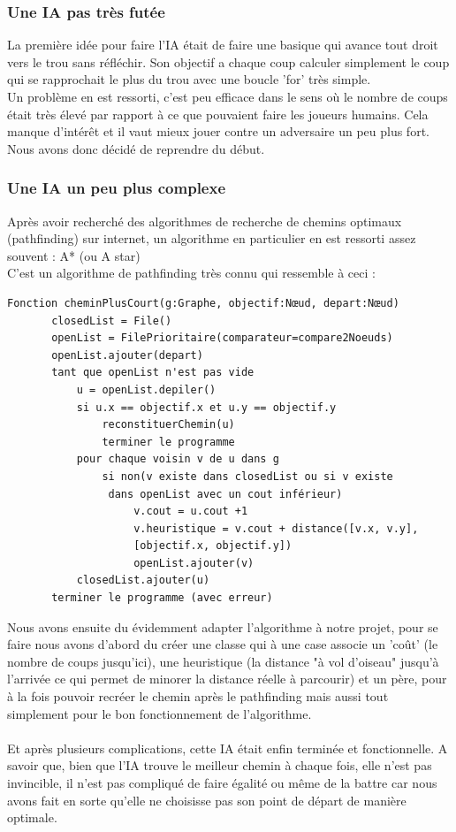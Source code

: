 \documentclass{article}
\begin{document}
\subsubsection{Une IA pas très futée}
La première idée pour faire l'IA était de faire une basique qui avance tout droit vers le trou sans réfléchir. Son objectif a chaque coup calculer simplement le coup qui se rapprochait le plus du trou avec une boucle 'for' très simple.\\
Un problème en est ressorti, c'est peu efficace dans le sens où le nombre de coups était très élevé par rapport à ce que pouvaient faire les joueurs humains. Cela manque d'intérêt et il vaut mieux jouer contre un adversaire un peu plus fort. Nous avons donc décidé de reprendre du début.\\
\subsubsection{Une IA un peu plus complexe}
Après avoir recherché des algorithmes de recherche de chemins optimaux (pathfinding) sur internet, un algorithme en particulier en est ressorti assez souvent : A* (ou A star)\\
C'est un algorithme de pathfinding très connu qui ressemble à ceci :
\begin{verbatim}
Fonction cheminPlusCourt(g:Graphe, objectif:Nœud, depart:Nœud)
       closedList = File()
       openList = FilePrioritaire(comparateur=compare2Noeuds)
       openList.ajouter(depart)
       tant que openList n'est pas vide
           u = openList.depiler()
           si u.x == objectif.x et u.y == objectif.y
               reconstituerChemin(u)
               terminer le programme
           pour chaque voisin v de u dans g
               si non(v existe dans closedList ou si v existe
                dans openList avec un cout inférieur)
                    v.cout = u.cout +1 
                    v.heuristique = v.cout + distance([v.x, v.y], 
                    [objectif.x, objectif.y])
                    openList.ajouter(v)
           closedList.ajouter(u)
       terminer le programme (avec erreur)
\end{verbatim}
Nous avons ensuite du évidemment adapter l'algorithme à notre projet, pour se faire nous avons d'abord du créer une classe qui à une case associe un 'coût' (le nombre de coups jusqu'ici), une heuristique (la distance "à vol d'oiseau" jusqu'à l'arrivée ce qui permet de minorer la distance réelle à parcourir) et un père, pour à la fois pouvoir recréer le chemin après le pathfinding mais aussi tout simplement pour le bon fonctionnement de l'algorithme. \\~\\
Et après plusieurs complications, cette IA était enfin terminée et fonctionnelle. A savoir que, bien que l'IA trouve le meilleur chemin à chaque fois, elle n'est pas invincible, il n'est pas compliqué de faire égalité ou même de la battre car nous avons fait en sorte qu'elle ne choisisse pas son point de départ de manière optimale.
\newpage
\end{document}
